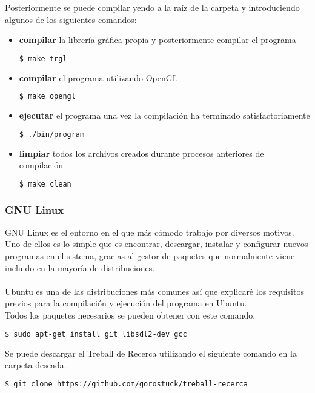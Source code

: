 \documentclass{report}
\begin{document}
Posteriormente se puede compilar yendo a la raíz de la carpeta y introduciendo algunos de los siguientes comandos:

\begin{itemize}
\item{\textbf{compilar} la librería gráfica propia y posteriormente compilar el programa}
\begin{lstlisting}[language=bash]
  $ make trgl
\end{lstlisting}
\item{\textbf{compilar} el programa utilizando OpenGL}
\begin{lstlisting}[language=bash]
  $ make opengl
\end{lstlisting}
\item{\textbf{ejecutar} el programa una vez la compilación ha terminado satisfactoriamente}
\begin{lstlisting}[language=bash]
  $ ./bin/program
\end{lstlisting}
\item{\textbf{limpiar} todos los archivos creados durante procesos anteriores de compilación}
\begin{lstlisting}[language=bash]
  $ make clean
\end{lstlisting}
\end{itemize}

\subsubsection{GNU Linux}
GNU Linux es el entorno en el que más cómodo trabajo por diversos motivos. Uno de ellos es lo simple que es encontrar, descargar, instalar y configurar nuevos programas en el sistema, gracias al gestor de paquetes que normalmente viene incluido en la mayoría de distribuciones.
\\\\
Ubuntu es una de las distribuciones más comunes así que explicaré los requisitos previos para la compilación y ejecución del programa en Ubuntu.
\\ Todos los paquetes necesarios se pueden obtener con este comando.
\begin{lstlisting}[language=bash]
  $ sudo apt-get install git libsdl2-dev gcc
\end{lstlisting}
Se puede descargar el Treball de Recerca utilizando el siguiente comando en la carpeta deseada.
\begin{lstlisting}[language=bash]
  $ git clone https://github.com/gorostuck/treball-recerca
\end{lstlisting}
\end{document}
